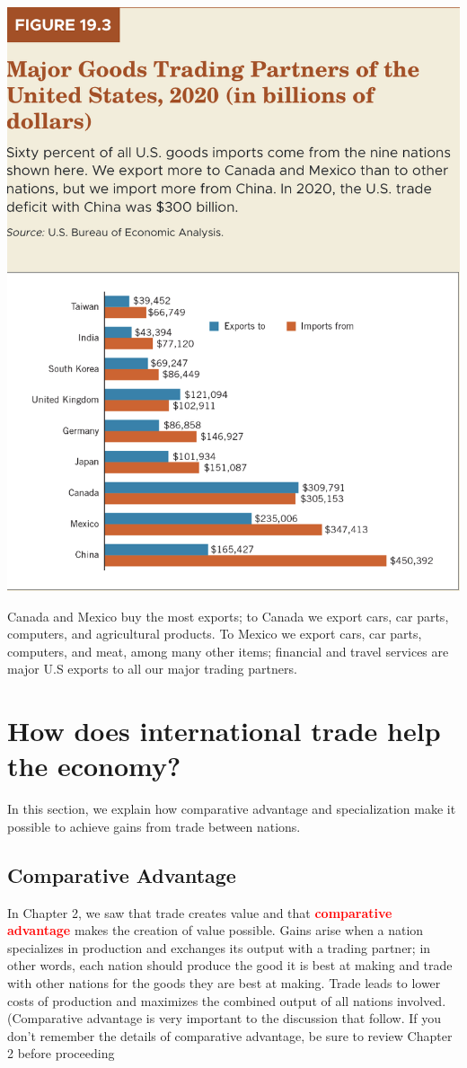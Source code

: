 \documentclass[11pt]{article} %
\begin{document}
\begin{center}
\includegraphics[scale=0.5]{images/Figure 19.3.png} 
\end{center}
Canada and Mexico buy the most exports; to Canada we export cars, car parts, computers, and agricultural products. To Mexico we export cars, car parts, computers, and meat, among many other items; financial and travel services are major U.S exports to all our major trading partners.

\section*{\textbf{How does international trade help the economy?}}
In this section, we explain how comparative advantage and specialization make it possible to achieve gains from trade between nations.

\subsection*{Comparative Advantage}
In Chapter 2, we saw that trade creates value and that \textbf{\textcolor{red}{comparative advantage}} makes the creation of value possible. Gains arise when a nation specializes in production and exchanges its output with a trading partner; in other words, each nation should produce the good it is best at making and trade with other nations for the goods they are best at making. Trade leads to lower costs of production and maximizes the combined output of all nations involved. (Comparative advantage is very important to the discussion that follow. If you don't remember the details of comparative advantage, be sure to review Chapter 2 before proceeding
\end{document}
